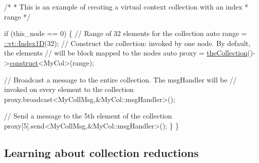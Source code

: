 \begin{DoxyCodeInclude}
  \textcolor{comment}{/*}
\textcolor{comment}{   * This is an example of creating a virtual context collection with an index}
\textcolor{comment}{   * range}
\textcolor{comment}{   */}

  \textcolor{keywordflow}{if} (this\_node == 0) \{
    \textcolor{comment}{// Range of 32 elements for the collection}
    \textcolor{keyword}{auto} range = \hyperlink{namespacevt_1_1index_a091a4f5a7a2c993d9727eaa60cf67d81}{::vt::Index1D}(32);
    \textcolor{comment}{// Construct the collection: invoked by one node. By default, the elements}
    \textcolor{comment}{// will be block mapped to the nodes}
    \textcolor{keyword}{auto} proxy = \hyperlink{namespacevt_a1c45ce63bfd2c327ff7d76a319a371d8}{theCollection}()->\hyperlink{structvt_1_1vrt_1_1collection_1_1_collection_manager_a4de84e9efd7a3948e3c20be549441cfd}{construct}<MyCol>(range);

    \textcolor{comment}{// Broadcast a message to the entire collection. The msgHandler will be}
    \textcolor{comment}{// invoked on every element to the collection}
    proxy.broadcast<MyCollMsg,&MyCol::msgHandler>();

    \textcolor{comment}{// Send a message to the 5th element of the collection}
    proxy[5].send<MyCollMsg,&MyCol::msgHandler>();
  \}
\}
\end{DoxyCodeInclude}
\hypertarget{tutorial-2b}{}\subsection{Learning about collection reductions}\label{tutorial-2b}

